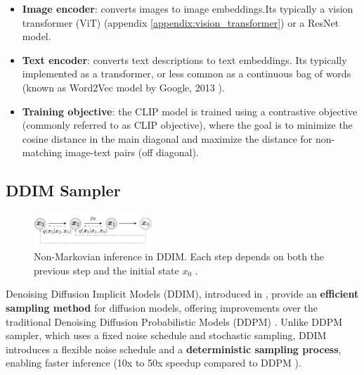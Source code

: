\begin{itemize}
    \item \textbf{Image encoder}: converts images to image embeddings.Its typically a vision transformer (ViT) \cite{vision_transformer} (appendix \ref{appendix:vision_transformer}) or a ResNet \cite{resnet} model.
    \item \textbf{Text encoder}: converts text descriptions to text embeddings. Its typically implemented as a transformer, or less common as a continuous bag of words \cite{cbow_word2vec} (known as Word2Vec model by Google, 2013 \cite{cbow_word2vec}).
    \item \textbf{Training objective}: the CLIP model is trained using a contrastive objective (commonly referred to as CLIP objective), where the goal is to minimize the cosine distance in the main diagonal and maximize the distance for non-matching image-text pairs (off diagonal).
\end{itemize}





















\subsection{DDIM Sampler}
\label{subsec:ddim_sampler}

\begin{figure}[ht]
    \centering
    \includegraphics[width=0.4\textwidth]{images/diffusion_models/stable_diffusion/ddim_non_markov_process.png}
    \caption{Non-Markovian inference in DDIM. Each step depends on both the previous step and the initial state $x_0$ \cite{ddim}.}
    \label{fig:ddim_non_markov_process}
\end{figure}

Denoising Diffusion Implicit Models (DDIM), introduced in \cite{ddim}, provide an \textbf{efficient sampling method} for diffusion models, offering improvements over the traditional Denoising Diffusion Probabilistic Models (DDPM) \cite{ddpm}. Unlike DDPM sampler, which uses a fixed noise schedule and stochastic sampling, DDIM introduces a flexible noise schedule and a \textbf{deterministic sampling process}, enabling faster inference (10x to 50x speedup compared to DDPM \cite{ddim}).

